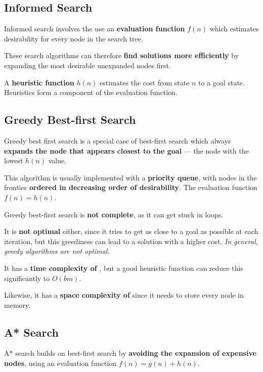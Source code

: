\begin{multicols*}{2}
    \section{Informed Search}
        Informed search involves the use an \textbf{evaluation function} $f(n)$ which estimates desirability for every node in the search tree.

        These search algorithms can therefore \textbf{find solutions more efficiently} by expanding the most desirable unexpanded nodes first.

        A \textbf{heuristic function} $h(n)$ estimates the cost from state $n$ to a goal state. Heuristics form a component of the evaluation function.

        \subsection{Greedy Best-first Search}
            Greedy best first search is a special case of best-first search which always \textbf{expands the node that appears closest to the goal} --- the node with the lowest $h(n)$ value.

            This algorithm is usually implemented with a \textbf{priority queue}, with nodes in the frontier \textbf{ordered in decreasing order of desirability}. The evaluation function $f(n) = h(n)$.

            Greedy best-first search is \textbf{not complete}, as it can get stuck in loops.

            It is \textbf{not optimal} either, since it tries to get as close to a goal as possible at each iteration, but this greediness can lead to a solution with a higher cost. \emph{In general, greedy algorithms are not optimal.}

            It has a \textbf{time complexity of} , but a good heuristic function can reduce this significantly to $O(bm)$.

            Likewise, it has a \textbf{space complexity of}  since it needs to store every node in memory.

        \subsection{A* Search}
            A* search builds on best-first search by \textbf{avoiding the expansion of expensive nodes}, using an evaluation function $f(n) = g(n) + h(n)$.


\end{multicols*}

